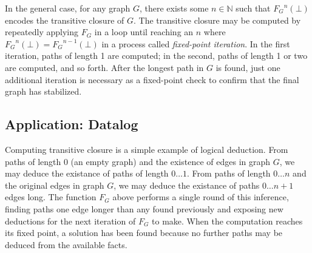 \begin{center}
\end{center}

In the general case, for any graph $G$, there exists some $n \in \mathbb{N}$ such that ${F_G}^n(\bot)$ encodes the transitive closure of $G$. The transitive closure may be computed by repeatedly applying $F_G$ in a loop until reaching an $n$ where ${F_G}^n(\bot) = {F_G}^{n-1}(\bot)$ in a process called \textit{fixed-point iteration}. In the first iteration, paths of length 1 are computed; in the second, paths of length 1 or two are computed, and so forth. After the longest path in $G$ is found, just one additional iteration is necessary as a fixed-point check to confirm that the final graph has stabilized. 


\subsection{Application: Datalog}
\label{sec:ra:tc}
%
Computing transitive closure is a simple example of logical deduction. From paths of length $0$ (an empty graph) and the existence of edges in graph $G$, we may deduce the existance of paths of length $0 \ldots 1$. From paths of length $0 \ldots n$ and the original edges in graph $G$, we may deduce the existance of paths $0 \ldots n+1$ edges long. The function $F_G$ above performs a single round of this inference, finding paths one edge longer than any found previously and exposing new deductions for the next iteration of $F_G$ to make. When the computation reaches its fixed point, a solution has been found because no further paths may be deduced from the available facts.

